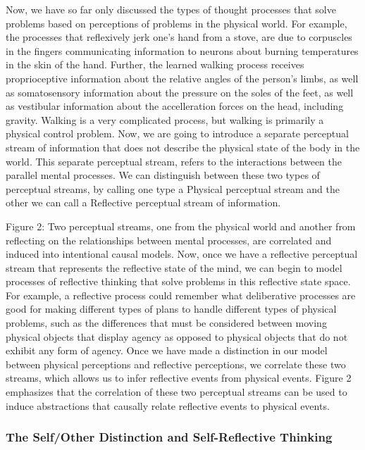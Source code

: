 Now, we have so far only discussed the types of thought processes that
solve problems based on perceptions of problems in the physical
world. For example, the processes that reflexively jerk one's hand
from a stove, are due to corpuscles in the fingers communicating
information to neurons about burning temperatures in the skin of the
hand. Further, the learned walking process receives proprioceptive
information about the relative angles of the person's limbs, as well
as somatosensory information about the pressure on the soles of the
feet, as well as vestibular information about the accelleration forces
on the head, including gravity. Walking is a very complicated process,
but walking is primarily a physical control problem. Now, we are going
to introduce a separate perceptual stream of information that does not
describe the physical state of the body in the world. This separate
perceptual stream, refers to the interactions between the parallel
mental processes. We can distinguish between these two types of
perceptual streams, by calling one type a Physical perceptual stream
and the other we can call a Reflective perceptual stream of
information.

Figure 2: Two perceptual streams, one from the physical world and
another from reflecting on the relationships between mental processes,
are correlated and induced into intentional causal models.  Now, once
we have a reflective perceptual stream that represents the reflective
state of the mind, we can begin to model processes of reflective
thinking that solve problems in this reflective state space. For
example, a reflective process could remember what deliberative
processes are good for making different types of plans to handle
different types of physical problems, such as the differences that
must be considered between moving physical objects that display agency
as opposed to physical objects that do not exhibit any form of
agency. Once we have made a distinction in our model between physical
perceptions and reflective perceptions, we correlate these two
streams, which allows us to infer reflective events from physical
events. Figure 2 emphasizes that the correlation of these two
perceptual streams can be used to induce abstractions that causally
relate reflective events to physical events.

\subsubsection{The Self/Other Distinction and Self-Reflective Thinking}

